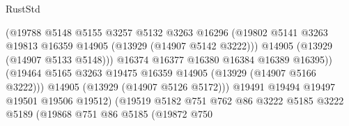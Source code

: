\begin{lexlean}{RustStd}
\begin{coremodule}
                                            (@19788
                                              @5148
                                              @5155
                                              @3257
                                              @5132
                                              @3263
                                              @16296
                                              (@19802
                                                @5141
                                                @3263
                                                @19813
                                                @16359
                                                @14905
                                                (@13929 (@14907 @5142 @3222)))
                                              @14905
                                              (@13929 (@14907 @5133 @5148)))
                                            @16374
                                            @16377
                                            @16380
                                            @16384
                                            @16389
                                            @16395))
                                        (@19464
                                          @5165
                                          @3263
                                          @19475
                                          @16359
                                          @14905
                                          (@13929 (@14907 @5166 @3222)))
                                        @14905
                                        (@13929 (@14907 @5126 @5172)))
                                      @19491
                                      @19494
                                      @19497
                                      @19501
                                      @19506
                                      @19512)
                                    (@19519
                                      @5182
                                      @751
                                      @762
                                      @86
                                      @3222
                                      @5185
                                      @3222
                                      @5189
                                      (@19868
                                        @751
                                        @86
                                        @5185
                                        (@19872
                                          @750

\end{coremodule}
\end{lexlean}
